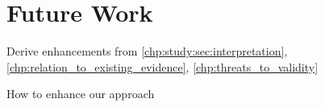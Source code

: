 \chapter{Future Work}
\label{chp:future_work}
Derive enhancements from \cref{chp:study:sec:interpretation}, \cref{chp:relation_to_existing_evidence}, \cref{chp:threats_to_validity}

How to enhance our approach






